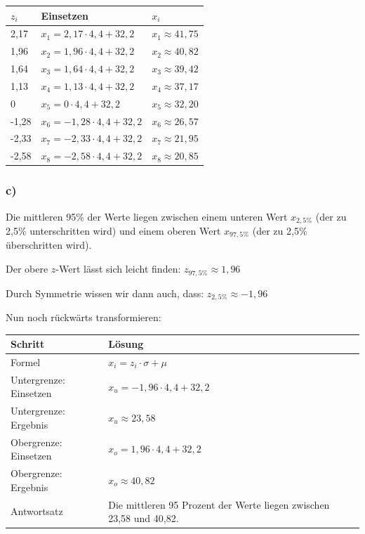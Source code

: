 \documentclass[
  11pt,
  ngerman,
  a4paper,
]{report}
\begin{document}
\begin{table}[H]
\centering
\begin{tabular}{lll}
\toprule
$z_i$ & Einsetzen & $x_i$\\
\midrule
2,17 & $x_{1} = 2{,}17 \cdot 4{,}4 + 32{,}2$ & $x_{1}\approx41{,}75$\\
1,96 & $x_{2} = 1{,}96 \cdot 4{,}4 + 32{,}2$ & $x_{2}\approx40{,}82$\\
1,64 & $x_{3} = 1{,}64 \cdot 4{,}4 + 32{,}2$ & $x_{3}\approx39{,}42$\\
1,13 & $x_{4} = 1{,}13 \cdot 4{,}4 + 32{,}2$ & $x_{4}\approx37{,}17$\\
0 & $x_{5} = 0 \cdot 4{,}4 + 32{,}2$ & $x_{5}\approx32{,}20$\\
-1,28 & $x_{6} = -1{,}28 \cdot 4{,}4 + 32{,}2$ & $x_{6}\approx26{,}57$\\
-2,33 & $x_{7} = -2{,}33 \cdot 4{,}4 + 32{,}2$ & $x_{7}\approx21{,}95$\\
-2,58 & $x_{8} = -2{,}58 \cdot 4{,}4 + 32{,}2$ & $x_{8}\approx20{,}85$\\
\bottomrule
\end{tabular}
\end{table}

\hypertarget{c-7}{%
\subsubsection{c)}\label{c-7}}

Die mittleren 95\% der Werte liegen zwischen einem unteren Wert \(x_{2{,}5\%}\) (der zu 2,5\% unterschritten wird) und einem oberen Wert \(x_{97{,}5\%}\) (der zu 2,5\% überschritten wird).

Der obere \(z\)-Wert lässt sich leicht finden: \(z_{97{,}5\%} \approx 1{,}96\)

Durch Symmetrie wissen wir dann auch, dass: \(z_{2{,}5\%} \approx -1{,}96\)

Nun noch rückwärts transformieren:

\begin{table}[H]
\centering
\begin{tabular}{ll}
\toprule
Schritt & Lösung\\
\midrule
Formel & $x_{i} = z_{i} \cdot \sigma + \mu$\\
Untergrenze: Einsetzen & $x_{u} = -1{,}96 \cdot 4{,}4 + 32{,}2$\\
Untergrenze: Ergebnis & $x_{u}\approx23{,}58$\\
Obergrenze: Einsetzen & $x_{o} = 1{,}96 \cdot 4{,}4 + 32{,}2$\\
Obergrenze: Ergebnis & $x_{o}\approx40{,}82$\\
Antwortsatz & Die mittleren 95 Prozent der Werte liegen zwischen 23,58 und 40,82.\\
\bottomrule
\end{tabular}
\end{table}
\end{document}
